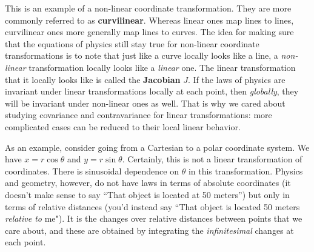 \documentclass[../master.tex]{subfiles}
\begin{document}
	This is an example of a non-linear coordinate transformation. They are more commonly referred to as \textbf{curvilinear}. Whereas linear ones map lines to lines, curvilinear ones more generally map lines to curves. The idea for making sure that the equations of physics still stay true for non-linear coordinate transformations is to note that just like a curve locally looks like a line, a \emph{non-linear} transformation locally looks like a \emph{linear} one. The linear transformation that it locally looks like is called the \textbf{Jacobian}  $J$. If the laws of physics are invariant under linear transformations locally at each point, then \emph{globally}, they will be invariant under non-linear ones as well. That is why we cared about studying covariance and contravariance for linear transformations: more complicated cases can be reduced to their local linear behavior.
	
	As an example, consider going from a Cartesian to a polar coordinate system. We have $x = r \cos \theta$ and $y = r \sin \theta$. Certainly, this is not a linear transformation of coordinates. There is sinusoidal dependence on $\theta$ in this transformation. Physics and geometry, however, do not have laws in terms of absolute coordinates (it doesn't make sense to say ``That object is located at 50 meters'') but only in terms of relative distances (you'd instead say ``That object is located 50 meters \emph{relative to} me"). It is the changes over relative distances between points that we care about, and these are obtained by integrating the \emph{infinitesimal} changes at each point. 
	
\end{document}
